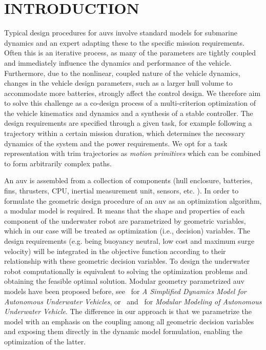 
\section{INTRODUCTION}


Typical design procedures for \acp{auv} involve standard models for submarine dynamics and an expert adapting these to the specific mission requirements. Often this is an iterative process, as many of the parameters are tightly coupled and immediately influence the dynamics and performance of the vehicle. Furthermore, due to the nonlinear, coupled nature of the vehicle dynamics, changes in the vehicle design parameters, such as a larger hull volume to accommodate more batteries, strongly affect the control design. We therefore aim to solve this challenge as a co-design process of a multi-criterion optimization of the vehicle kinematics and dynamics and a synthesis of a stable controller. The design requirements are specified through a given task, for example following a trajectory within a certain mission duration, which determines the necessary dynamics of the system and the power requirements. We opt for a task representation with trim trajectories as \emph{motion primitives} which can be combined to form arbitrarily complex paths.

An \ac{auv} is assembled from a collection of components (hull enclosure, batteries, fins, thrusters, CPU, inertial measurement unit, sensors, etc. ). In order to formulate the geometric design procedure of an \ac{auv} as an optimization algorithm, a modular model is required. It means that the shape and properties of each component of the underwater robot are parametrized by geometric variables, which in our case will be treated as optimization (i.e., decision) variables. The design requirements (e.g. being buoyancy neutral, low cost and maximum surge velocity) will be integrated in the objective function according to their relationship with these geometric decision variables. To design the underwater robot computationally is equivalent to solving the optimization problems and obtaining the feasible optimal solution. Modular geometry parametrized \ac{auv} models have been proposed before, see~\cite{c14} for \emph{A Simplified Dynamics Model for Autonomous Underwater Vehicles}, or~\cite{c15} and~\cite{c16} for \emph{Modular Modeling of Autonomous Underwater Vehicle}. The difference in our approach is that we parametrize the model with an emphasis on the coupling among all geometric decision variables and exposing them directly in the dynamic model formulation, enabling the optimization of the latter.

